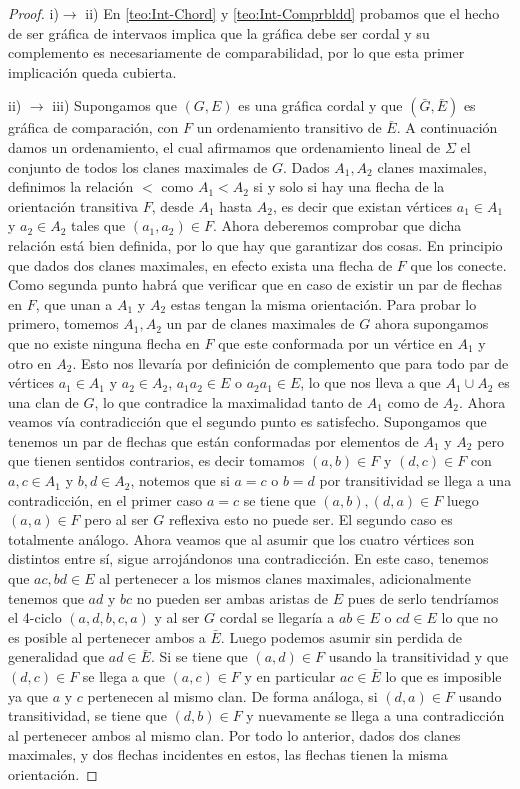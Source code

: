 \begin{proof}
    i)$\to$ ii) En \cref{teo:Int-Chord} y \cref{teo:Int-Comprbldd} probamos que el hecho de ser gráfica de intervaos implica que la gráfica debe ser cordal y su complemento es necesariamente de comparabilidad, por lo que esta primer implicación queda cubierta.
    
    ii) $\to$ iii) Supongamos que $(G,E)$ es una gráfica cordal y que $(\bar{G}, \bar{E})$ es gráfica de comparación, con $F$ un ordenamiento transitivo de $\bar{E}$. A continuación damos un ordenamiento, el cual afirmamos que ordenamiento lineal de $\Sigma$ el conjunto de todos los clanes maximales de $G$. Dados  $A_1, A_2$ clanes maximales, definimos la relación $<$ como $A_1 < A_2$ si y solo si hay una flecha de la orientación transitiva $F$, desde $A_1$ hasta $A_2$, es decir que existan vértices $a_1 \in A_1$ y $a_2 \in A_2$ tales que $(a_1,a_2)\in F$. 
    Ahora deberemos comprobar que dicha relación está bien definida, por lo que hay que garantizar dos cosas. En principio que dados dos clanes maximales, en efecto exista una flecha de $F$ que los conecte. Como segunda punto habrá que verificar que en caso de existir un par de flechas en $F$, que unan a $A_1$ y $A_2$ estas tengan la misma orientación. Para probar lo primero, tomemos $A_1,A_2$ un par de clanes maximales de $G$ ahora supongamos que no existe ninguna flecha en $F$ que este conformada por un vértice en $A_1$ y otro en $A_2$. Esto nos llevaría por definición de complemento que para todo par de vértices $a_1\in A_1$ y $a_2 \in A_2$,  $a_1a_2\in E$ o $a_2a_1\in E$, lo que nos lleva a que $A_1 \cup A_2$ es una clan de $G$, lo que contradice la maximalidad tanto de $A_1$ como de $A_2$. Ahora veamos vía contradicción que el segundo punto es satisfecho. Supongamos que tenemos un par de flechas que están conformadas por elementos de $A_1$ y $A_2$ pero que tienen sentidos contrarios, es decir tomamos $(a,b)\in F$ y $(d,c)\in F$ con $a,c \in A_1$ y $b,d\in A_2$, notemos que si $a=c $ o $b=d$ por transitividad se llega a una contradicción, en el primer caso $a=c$ se tiene que $(a,b), (d,a)\in F$ luego $(a,a)\in F$ pero al ser $G$ reflexiva esto no puede ser. El segundo caso es totalmente análogo. Ahora veamos que al asumir que los cuatro vértices son distintos entre sí, sigue arrojándonos una contradicción. En este caso, tenemos que $ac, bd\in E$ al pertenecer a los mismos clanes maximales, adicionalmente tenemos que $ad$ y $bc$ no pueden ser ambas aristas de $E$ pues de serlo tendríamos el 4-ciclo $(a,d,b,c,a)$ y al ser $G$ cordal se llegaría a $ab\in E$ o $cd\in E$ lo que no es posible al pertenecer ambos a $\bar{E}$. Luego podemos asumir sin perdida de generalidad que $ad \in \bar{E}$. Si se tiene que $(a,d)\in F$ usando la transitividad y que $(d,c)\in F$ se llega a que $(a,c)\in F$ y en particular $ac\in \bar{E}$ lo que es imposible ya que $a$ y $c$ pertenecen al mismo clan. De forma análoga, si $(d,a)\in F$ usando transitividad, se tiene que $(d,b)\in F$ y nuevamente se llega a una contradicción al pertenecer ambos al mismo clan. Por todo lo anterior, dados dos clanes maximales, y dos flechas incidentes en estos, las flechas tienen la misma orientación. 

\end{proof}
